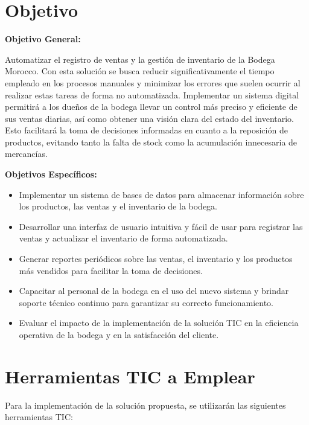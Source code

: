\documentclass{article}
\begin{document}
\newpage

\section{Objetivo}

  \begin{spacing}{1.5}
    \noindent
    \textbf{Objetivo General:} 
    
    Automatizar el registro de ventas y la gestión de inventario de la Bodega Morocco. Con esta solución se busca reducir significativamente el tiempo empleado en los procesos manuales y minimizar los errores que suelen ocurrir al realizar estas tareas de forma no automatizada. Implementar un sistema digital permitirá a los dueños de la bodega llevar un control más preciso y eficiente de sus ventas diarias, así como obtener una visión clara del estado del inventario. Esto facilitará la toma de decisiones informadas en cuanto a la reposición de productos, evitando tanto la falta de stock como la acumulación innecesaria de mercancías.

    \textbf{Objetivos Específicos:}
    \begin{itemize}
      \item Implementar un sistema de bases de datos para almacenar información sobre los productos, las ventas y el inventario de la bodega.
      \item Desarrollar una interfaz de usuario intuitiva y fácil de usar para registrar las ventas y actualizar el inventario de forma automatizada.
      \item Generar reportes periódicos sobre las ventas, el inventario y los productos más vendidos para facilitar la toma de decisiones.
      \item Capacitar al personal de la bodega en el uso del nuevo sistema y brindar soporte técnico continuo para garantizar su correcto funcionamiento.
      \item Evaluar el impacto de la implementación de la solución TIC en la eficiencia operativa de la bodega y en la satisfacción del cliente.
    \end{itemize}
  \end{spacing}

\newpage

\section{Herramientas TIC a Emplear}

  Para la implementación de la solución propuesta, se utilizarán las siguientes herramientas TIC:
\end{document}
